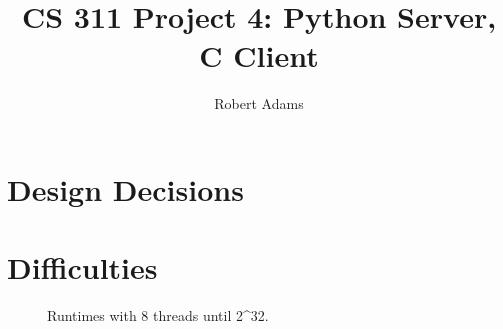 \documentclass[letterpaper,10pt]{article} %
\begin{document}
  \title{CS 311 Project 4: Python Server, C Client}
  \author{Robert Adams}
\maketitle


\section{Design Decisions}


	

\section{Difficulties}



\begin{figure}[p]
    \centering
    
    \caption{Runtimes with 8 threads until 2\textasciicircum32. }
    \label{runtimes}
\end{figure}
\end{document}
